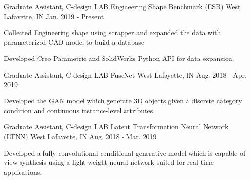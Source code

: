 


\begin{cventries}

\cventry
{Graduate Assistant, C-design LAB} %
{Engineering Shape Benchmark (ESB)} %
{West Lafayette, IN} %
{Jan. 2019 - Present} %
{ %
\begin{cvitems}
\item {Collected Engineering shape using scrapper and expanded the data with parameterized CAD model to build a database}
\item {Developed Creo Parametric and SolidWorks Python API for data expansion.}
\end{cvitems}
}

\cventry
{Graduate Assistant, C-design LAB} %
{FuseNet} %
{West Lafayette, IN} %
{Aug. 2018 - Apr. 2019} %
{ %
\begin{cvitems}
\item {Developed the GAN model which generate 3D objects given a discrete category condition and continuous instance-level attributes.}
\end{cvitems}
}



\cventry
{Graduate Assistant, C-design LAB} %
{Latent Transformation Neural Network (LTNN)} %
{West Lafayette, IN} %
{Aug. 2018 - Mar. 2019} %
{ %
\begin{cvitems}
\item {Developed a fully-convolutional conditional generative model which is capable of view synthesis using a light-weight neural network suited for real-time applications.}
\end{cvitems}
}


\end{cventries}
